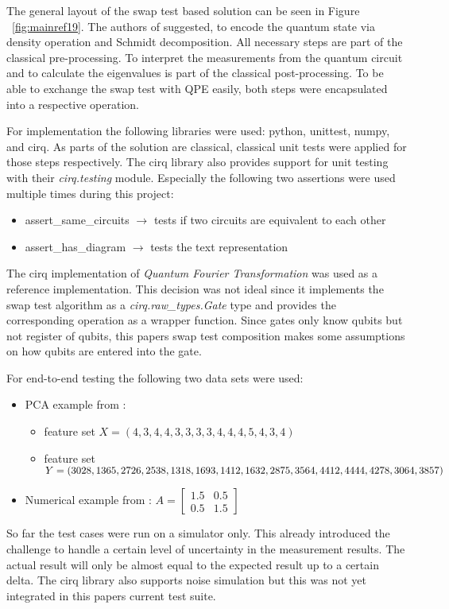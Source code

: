 The general layout of the swap test based solution can be seen in Figure ~\ref{fig:mainref19}. The authors of \cite[pp. 64-65]{Lokho_2020} suggested, to encode the quantum state via density operation and Schmidt decomposition. All necessary steps are part of the classical pre-processing. To interpret the measurements from the quantum circuit and to calculate the eigenvalues is part of the classical post-processing. To be able to exchange the swap test with QPE easily, both steps were encapsulated into a respective operation.

For implementation the following libraries were used: python, unittest, numpy, and cirq. As parts of the solution are classical, classical unit tests were applied for those steps respectively. The cirq library also provides support for unit testing with their \emph{cirq.testing} module. Especially the following two assertions were used multiple times during this project:
\begin{itemize}
  \item assert\_same\_circuits $\rightarrow$ tests if two circuits are equivalent to each other
  \item assert\_has\_diagram $\rightarrow$ tests the text representation
\end{itemize}

The cirq implementation of \emph{Quantum Fourier Transformation} \cite{Cirq_Qft} was used as a reference implementation. This decision was not ideal since it implements the swap test algorithm as a \emph{cirq.raw\_types.Gate} type and provides the corresponding operation as a wrapper function. Since gates only know qubits but not register of qubits, this papers swap test composition makes some assumptions on how qubits are entered into the gate.

For end-to-end testing the following two data sets were used:
\begin{itemize}
  \item PCA example from \cite[p. 63]{Lokho_2020}:
    \begin{itemize}
      \item feature set $X = (4, 3, 4, 4, 3, 3, 3, 3, 4, 4, 4, 5, 4, 3, 4)$
      \item feature set $Y = (3028, 1365, 2726, 2538, 1318, 1693, \\ 1412, 1632, 2875, 3564, 4412, 4444, 4278, 3064, 3857)$
    \end{itemize}
  \item Numerical example from \cite[p. 5]{He_2021}: $A = \begin{bmatrix} 1.5 & 0.5 \\ 0.5 & 1.5 \end{bmatrix}$
\end{itemize}
So far the test cases were run on a simulator only. This already introduced the challenge to handle a certain level of uncertainty in the measurement results. The actual result will only be almost equal to the expected result up to a certain delta. The cirq library also supports noise simulation but this was not yet integrated in this papers current test suite.

